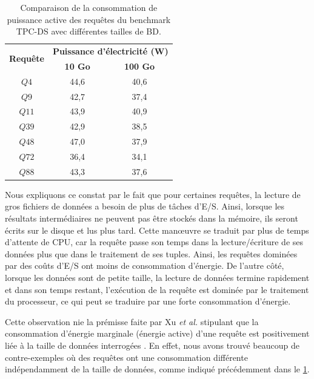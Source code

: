 \begin{table}[]
\centering
\caption {Comparaison de la consommation de puissance active des requêtes du benchmark TPC-DS avec différentes tailles de BD.} \label{tab:query-comp}
\begin{tabular}{ccc}
\toprule
\multirow{2}{*}{\textbf{Requête}} & \multicolumn{2}{c}{\textbf{Puissance d'électricité (W)}} \\ \cmidrule(l){2-3} 
                                & \textbf{10 Go}                  & \textbf{100 Go}                 \\ \midrule
	$Q4$           & 44,6       & 40,6        \\ 
    $Q9$           & 42,7       & 37,4        \\ 
    $Q11$          & 43,9       & 40,9        \\ 
    $Q39$          & 42,9       & 38,5        \\ 
    $Q48$          & 47,0       & 37,9        \\     
    $Q72$          & 36,4       & 34,1        \\ 
    $Q88$          & 43,3       & 37,6        \\ \bottomrule
\end{tabular}
\end{table}

Nous expliquons ce constat par le fait que pour certaines requêtes, la lecture de gros fichiers de données a besoin de plus de tâches d'E/S. Ainsi, lorsque les résultats intermédiaires ne peuvent pas être stockés dans la mémoire, ils seront écrits sur le disque et lus plus tard. Cette manœuvre se traduit par plus de temps d'attente de CPU, car la requête passe son temps dans la lecture/écriture de ses données plus que dans le traitement de ses tuples. Ainsi, les requêtes dominées par des coûts d'E/S ont moins de consommation d'énergie. De l'autre côté, lorsque les données sont de petite taille, la lecture de données termine rapidement et dans son temps restant, l'exécution de la requête est dominée par le traitement du processeur, ce qui peut se traduire par une forte consommation d'énergie.

Cette observation nie la prémisse faite par Xu \textit{et al.} stipulant que la consommation d'énergie marginale (énergie active) d'une requête est positivement liée à la taille de données interrogées \cite{Xu13}. En effet, nous avons trouvé beaucoup de contre-exemples où des requêtes ont une consommation différente indépendamment de la taille de données, comme indiqué précédemment dans le \ref{tab:query-comp}.

